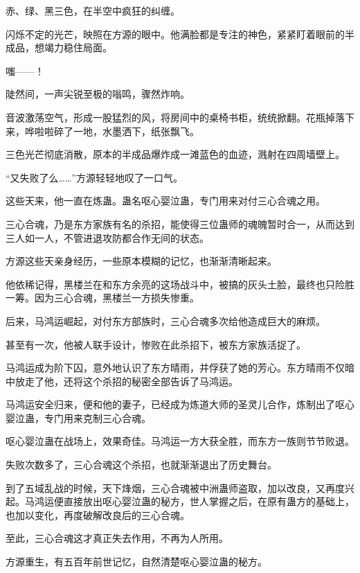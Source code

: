 
\begin{this_body}

赤、绿、黑三色，在半空中疯狂的纠缠。

闪烁不定的光芒，映照在方源的眼中。他满脸都是专注的神色，紧紧盯着眼前的半成品，想竭力稳住局面。

嗤——！

陡然间，一声尖锐至极的嗡鸣，骤然炸响。

音波激荡空气，形成一股猛烈的风，将房间中的桌椅书柜，统统掀翻。花瓶掉落下来，哗啦啦碎了一地，水墨洒下，纸张飘飞。

三色光芒彻底消散，原本的半成品爆炸成一滩蓝色的血迹，溅射在四周墙壁上。

“又失败了么……”方源轻轻地叹了一口气。

这些天来，他一直在炼蛊。蛊名呕心婴泣蛊，专门用来对付三心合魂之用。

三心合魂，乃是东方家族有名的杀招，能使得三位蛊师的魂魄暂时合一，从而达到三人如一人，不管进退攻防都合作无间的状态。

方源这些天亲身经历，一些原本模糊的记忆，也渐渐清晰起来。

他依稀记得，黑楼兰在和东方余亮的这场战斗中，被搞的灰头土脸，最终也只险胜一筹。因为三心合魂，黑楼兰一方损失惨重。

后来，马鸿运崛起，对付东方部族时，三心合魂多次给他造成巨大的麻烦。

甚至有一次，他被人联手设计，惨败在此杀招下，被东方家族活捉了。

马鸿运成为阶下囚，意外地认识了东方晴雨，并俘获了她的芳心。东方晴雨不仅暗中放走了他，还将这个杀招的秘密全部告诉了马鸿运。

马鸿运安全归来，便和他的妻子，已经成为炼道大师的圣灵儿合作，炼制出了呕心婴泣蛊，专门用来克制三心合魂。

呕心婴泣蛊在战场上，效果奇佳。马鸿运一方大获全胜，而东方一族则节节败退。

失败次数多了，三心合魂这个杀招，也就渐渐退出了历史舞台。

到了五域乱战的时候，天下烽烟，三心合魂被中洲蛊师盗取，加以改良，又再度兴起。马鸿运便直接放出呕心婴泣蛊的秘方，世人掌握之后，在原有蛊方的基础上，也加以变化，再度破解改良后的三心合魂。

至此，三心合魂这才真正失去作用，不再为人所用。

方源重生，有五百年前世记忆，自然清楚呕心婴泣蛊的秘方。


\end{this_body}
